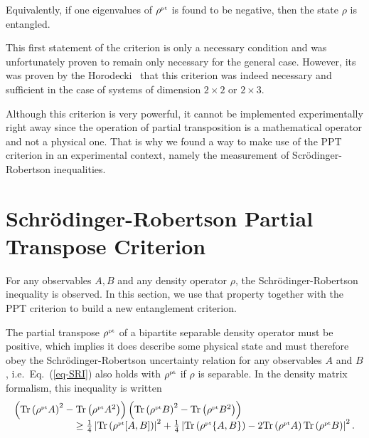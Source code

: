 
Equivalently, if one eigenvalues of $\rho^{\mbox{\tiny \textup{pt}}}$ is found to be negative, then the state $\rho$ is entangled.

This first statement of the criterion is only a necessary condition and was unfortunately proven to remain only necessary for the general case. However, its was proven by the Horodecki~\cite{HHH96} that this criterion was indeed necessary and sufficient in the case of systems of dimension $2\times 2$ or $2\times 3$.


Although this criterion is very powerful, it cannot be implemented experimentally right away since the operation of partial transposition is a mathematical operator and not a physical one. That is why we found a way to make use of the PPT criterion in an experimental context, namely the measurement of Scr\"odinger-Robertson inequalities.

\section{Schr\"odinger-Robertson Partial Transpose Criterion} \label{sec-SRPT}

For any observables $A, B$ and any density operator $\rho$, the Schr\"odinger-Robertson inequality is observed. In this section, we use that property together with the PPT criterion to build a new entanglement criterion.

The partial transpose $\rho^{\mbox{\tiny \textup{pt}}}$ of a bipartite separable density operator must be positive, which implies it does describe some physical state and must therefore obey the Schr\"odinger-Robertson uncertainty relation for any observables $A$ and $B$, i.e.~Eq.~(\ref{eq-SRI}) also holds with $\rho^{\mbox{\tiny \textup{pt}}}$ if $\rho$ is separable. In the density matrix formalism, this inequality is written
\[ \begin{array}{c}
    \left( \tr{\pt \rho A}^2 - \tr{\pt \rho A^2} \right) \left( \tr{\pt \rho B}^2 - \tr{\pt \rho B^2} \right)  \hspace{4cm} \\  \hfill \ge \frac 1 4 \left| \tr{\pt\rho [A,B]} \right|^2+\frac 1 4 \left| \tr{\pt\rho \{A,B\}} - 2  \tr{\pt \rho A} \tr{\pt \rho B}\right|^2.
  \end{array}\]

